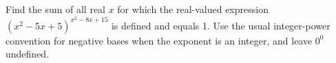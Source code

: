 Find the sum of all real $x$ for which the real-valued expression $(x^2-5x+5)^{x^2-8x+15}$ is defined and equals 1. Use the usual integer-power convention for negative bases when the exponent is an integer, and leave $0^0$ undefined.
